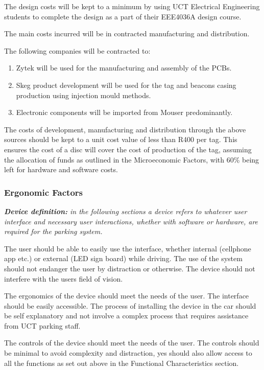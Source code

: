 The design costs will be kept to a minimum by using UCT Electrical Engineering students to complete the design as a part of their EEE4036A design course.

The main costs incurred will be in contracted manufacturing and distribution. 

The following companies will be contracted to:
\begin{enumerate}
\item Zytek will be used for the manufacturing and assembly of the PCBs.
\item Skeg product development will be used for the tag and beacons casing production using injection mould methods.
\item Electronic components will be imported from Mouser predominantly. 
\end{enumerate}

The costs of development, manufacturing and distribution through the above sources should be kept to a unit cost value of less than R400 per tag. This ensures the cost of a disc will cover the cost of production of the tag, assuming  the allocation of funds as outlined in the Microeconomic Factors, with 60\% being left for hardware and software costs.

\newpage
\subsubsection{Ergonomic Factors}
\textit{\textbf{Device definition:} in the following sections a device refers to whatever user interface and necessary user interactions, whether with software or hardware, are required for the parking system.}

The user should be able to easily use the interface, whether internal (cellphone app etc.) or external (LED sign board) while driving. The use of the system should not endanger the user by distraction or otherwise. The device should not interfere with the users field of vision.

The ergonomics of the device should meet the needs of the user. The interface should be easily accessible. The process of installing the device in the car should be self explanatory and not involve a complex process that requires assistance from UCT parking staff.

The controls of the device should meet the needs of the user. The controls should be minimal to avoid complexity and distraction, yes should also allow access to all the functions as set out above in the Functional Characteristics section.
